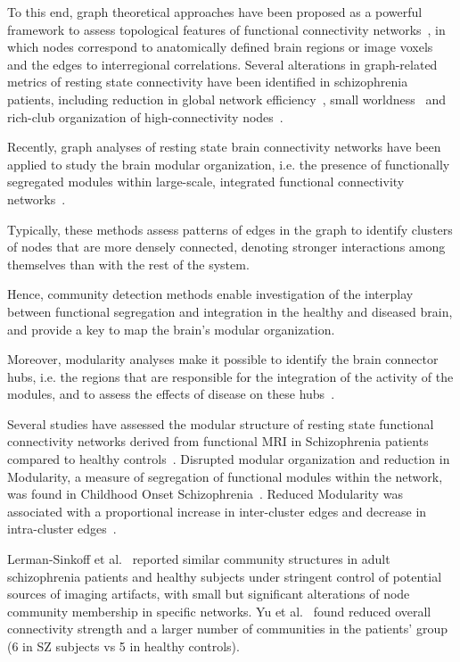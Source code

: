 To this end, graph theoretical approaches have been proposed as a powerful framework to assess topological features of functional connectivity networks~\cite{bassett2006,bullmore2009,kaiser2011,stam2007}, in which nodes correspond to anatomically defined brain regions or image voxels and the edges to interregional correlations.
Several alterations in graph-related metrics of resting state connectivity have been identified in schizophrenia patients, including reduction in global network efficiency~\cite{liu2008,bullmore2009,bassett2008}, small worldness~\cite{liu2008,anderson2013,yu2011} and rich-club organization of high-connectivity nodes~\cite{vandenheuvel2013}.


Recently, graph analyses of resting state brain connectivity networks have been applied to study the brain modular organization, i.e.
the presence of functionally segregated modules within large-scale, integrated functional connectivity networks~\cite{salvador2005a}.

Typically, these methods assess patterns of edges in the graph to identify clusters of nodes that are more densely connected, denoting stronger interactions among themselves than with the rest of the system.

Hence, community detection methods enable investigation of the interplay between functional segregation and integration in the healthy and diseased brain, and provide a key to map the brain's modular organization.

Moreover, modularity analyses make it possible to identify the brain connector hubs, i.e. the regions that are responsible for the integration of the activity of the modules, and to assess the effects of disease on these hubs~\cite{vandenheuvel2013a}.

Several studies have assessed the modular structure of resting state functional connectivity networks derived from functional MRI in Schizophrenia patients compared to healthy controls~\cite{liu2008,alexander-bloch2010,lerman-sinkoff2016}.
Disrupted modular organization and reduction in Modularity, a measure of segregation of functional modules within the network, was found in Childhood Onset Schizophrenia~\cite{alexander-bloch2010}.
Reduced Modularity was associated with a proportional increase in inter-cluster edges and decrease in intra-cluster edges~\cite{alexander-bloch2012}.

Lerman-Sinkoff et al.~\cite{lerman-sinkoff2016} reported similar community structures in adult schizophrenia patients and healthy subjects under stringent control of potential sources of imaging artifacts, with small but significant alterations of node community membership in specific networks.
Yu et al.~\cite{yu2012} found reduced overall connectivity strength and a larger number of communities in the patients' group (6 in SZ subjects vs 5 in healthy controls).

